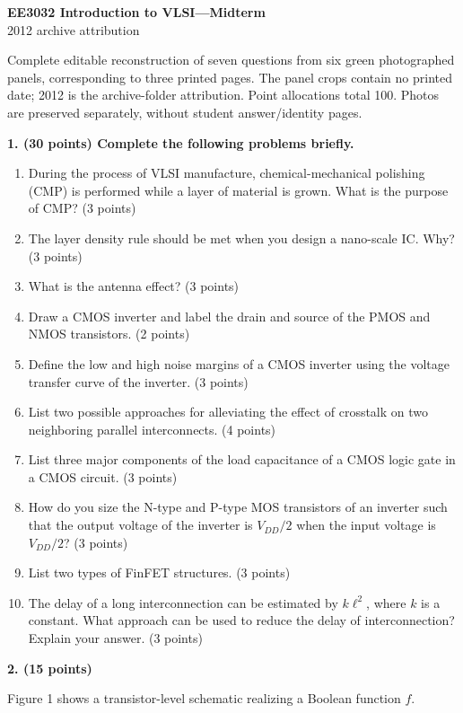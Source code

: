 \documentclass[10pt]{article}
\newcommand{\qheading}[1]{\par\medskip\textbf{#1}\par}
\begin{document}
\begin{center}{\Large\bfseries EE3032 Introduction to VLSI---Midterm}\\2012 archive attribution\end{center}
\small Complete editable reconstruction of seven questions from six green photographed panels, corresponding to three printed pages. The panel crops contain no printed date; 2012 is the archive-folder attribution. Point allocations total 100. Photos are preserved separately, without student answer/identity pages.\normalsize
\qheading{1. (30 points) Complete the following problems briefly.}
\begin{enumerate}[label=(\alph*),leftmargin=7mm]
\item During the process of VLSI manufacture, chemical-mechanical polishing (CMP) is performed while a layer of material is grown. What is the purpose of CMP? (3 points)
\item The layer density rule should be met when you design a nano-scale IC. Why? (3 points)
\item What is the antenna effect? (3 points)
\item Draw a CMOS inverter and label the drain and source of the PMOS and NMOS transistors. (2 points)
\item Define the low and high noise margins of a CMOS inverter using the voltage transfer curve of the inverter. (3 points)
\item List two possible approaches for alleviating the effect of crosstalk on two neighboring parallel interconnects. (4 points)
\item List three major components of the load capacitance of a CMOS logic gate in a CMOS circuit. (3 points)
\item How do you size the N-type and P-type MOS transistors of an inverter such that the output voltage of the inverter is $V_{DD}/2$ when the input voltage is $V_{DD}/2$? (3 points)
\item List two types of FinFET structures. (3 points)
\item The delay of a long interconnection can be estimated by $k\ell^2$, where $k$ is a constant. What approach can be used to reduce the delay of interconnection? Explain your answer. (3 points)
\end{enumerate}
\qheading{2. (15 points)} Figure 1 shows a transistor-level schematic realizing a Boolean function $f$.
\end{document}
